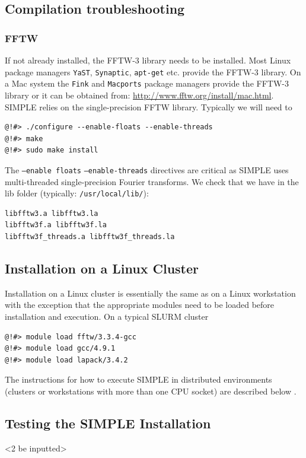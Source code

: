 \documentclass[a4paper,11pt]{article}
\begin{document}
\subsection{Compilation troubleshooting}
\label{compiletrouble}

\subsubsection{FFTW}
If not already installed, the FFTW-3 library needs to be installed. Most Linux package managers \texttt{YaST}, \texttt{Synaptic}, \texttt{apt-get} etc. provide the FFTW-3 library. On a Mac system the \texttt{Fink} and \texttt{Macports} package managers provide the FFTW-3 library or it can be obtained from: \url{http://www.fftw.org/install/mac.html}. SIMPLE relies on the single-precision FFTW library. Typically we will need to
\begin{verbatim}
@!#> ./configure --enable-floats --enable-threads
@!#> make
@!#> sudo make install
\end{verbatim}
The \texttt{--enable floats} \texttt{--enable-threads} directives are critical as SIMPLE uses multi-threaded single-precision Fourier transforms. We check that we have in the lib folder (typically: \texttt{/usr/local/lib/}):
\begin{verbatim}
libfftw3.a libfftw3.la
libfftw3f.a libfftw3f.la
libfftw3f_threads.a libfftw3f_threads.la
\end{verbatim}

\subsection{Installation on a Linux Cluster}
\label{inst_clusters_linux}

Installation on a Linux cluster is essentially the same as on a Linux workstation with the exception that the appropriate modules need to be loaded before installation and execution. On a typical SLURM cluster
\begin{verbatim}
@!#> module load fftw/3.3.4-gcc
@!#> module load gcc/4.9.1
@!#> module load lapack/3.4.2 
\end{verbatim}
The instructions for how to execute SIMPLE in distributed environments (clusters or workstations with more than one CPU socket) are described below \label{distr}.

\subsection{Testing the SIMPLE Installation}
<2 be inputted>
\end{document}
